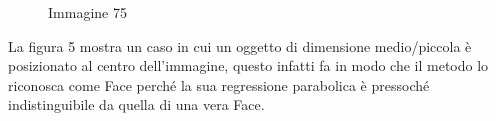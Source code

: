 \documentclass[
  italian,
]{article}
\begin{document}
\begin{figure}
\centering
{}%
\qquad
{}%
\qquad
{}%
\caption{Immagine 75}
\end{figure}
La figura 5 mostra un caso in cui un oggetto di dimensione medio/piccola è posizionato al centro dell'immagine, questo infatti fa in modo che il metodo lo riconosca come Face perché la sua regressione parabolica è pressoché indistinguibile da quella di una vera Face.
\end{document}
